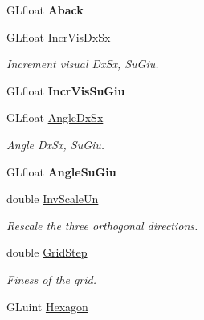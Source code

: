 \begin{DoxyCompactItemize}
\item 
G\+Lfloat {\bfseries Aback}\hypertarget{classDraw_aec50037c9399a63029b700998c5fb571}{}\label{classDraw_aec50037c9399a63029b700998c5fb571}

\item 
G\+Lfloat \hyperlink{classDraw_a845a34fce40581505bbba9cceb8a7266}{Incr\+Vis\+Dx\+Sx}\hypertarget{classDraw_a845a34fce40581505bbba9cceb8a7266}{}\label{classDraw_a845a34fce40581505bbba9cceb8a7266}

\begin{DoxyCompactList}\small\item\em Increment visual Dx\+Sx, Su\+Giu. \end{DoxyCompactList}\item 
G\+Lfloat {\bfseries Incr\+Vis\+Su\+Giu}\hypertarget{classDraw_a93ae32650d64100b155fc7895c96b80b}{}\label{classDraw_a93ae32650d64100b155fc7895c96b80b}

\item 
G\+Lfloat \hyperlink{classDraw_ac4d6a04b585898500e8de28bfb0a926b}{Angle\+Dx\+Sx}\hypertarget{classDraw_ac4d6a04b585898500e8de28bfb0a926b}{}\label{classDraw_ac4d6a04b585898500e8de28bfb0a926b}

\begin{DoxyCompactList}\small\item\em Angle Dx\+Sx, Su\+Giu. \end{DoxyCompactList}\item 
G\+Lfloat {\bfseries Angle\+Su\+Giu}\hypertarget{classDraw_a08a47162402b1a4ba83ebfd799b833e9}{}\label{classDraw_a08a47162402b1a4ba83ebfd799b833e9}

\item 
double \hyperlink{classDraw_ae460da3c47449cbbd76b22e9c2501a69}{Inv\+Scale\+Un}\hypertarget{classDraw_ae460da3c47449cbbd76b22e9c2501a69}{}\label{classDraw_ae460da3c47449cbbd76b22e9c2501a69}

\begin{DoxyCompactList}\small\item\em Rescale the three orthogonal directions. \end{DoxyCompactList}\item 
double \hyperlink{classDraw_a48af8052c97c27dcadc5524421180495}{Grid\+Step}\hypertarget{classDraw_a48af8052c97c27dcadc5524421180495}{}\label{classDraw_a48af8052c97c27dcadc5524421180495}

\begin{DoxyCompactList}\small\item\em Finess of the grid. \end{DoxyCompactList}\item 
G\+Luint \hyperlink{classDraw_ab3a3a889149c8b1ff7e39ca3c032f16c}{Hexagon}\hypertarget{classDraw_ab3a3a889149c8b1ff7e39ca3c032f16c}{}\label{classDraw_ab3a3a889149c8b1ff7e39ca3c032f16c}


\end{DoxyCompactItemize}
